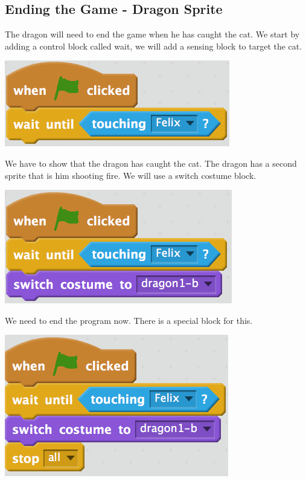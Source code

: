 \documentclass[12pt]{article}
\begin{document}
\begin{itemize}
\begin{center}
		\end{center}
	\end{itemize}
	
	
	
\subsection*{Ending the Game - Dragon Sprite}
	\begin{itemize}
		\item The dragon will need to end the game when he has caught the cat.  We start by adding a control block called wait, we will add a sensing block to target the cat.
		\begin{center}
			\item[] \includegraphics[scale=1.0]{./Images/dragon7.png}
		\end{center}
		\newpage
		\item We have to show that the dragon has caught the cat.  The dragon has a second sprite that is him shooting fire. We will use a switch costume block.
		\begin{center}
			\item[] \includegraphics[scale=1.0]{./Images/dragon8.png}
		\end{center}
		\item We need to end the program now. There is a special block for this.
		\begin{center}
			\item[] \includegraphics[scale=1.0]{./Images/dragon9.png}
		\end{center}
	\end{itemize}
	
\end{document}
